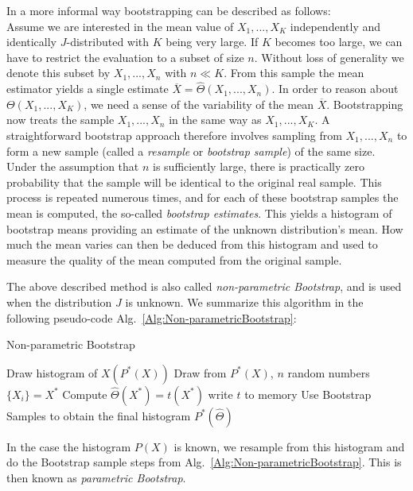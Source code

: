 \documentclass[11pt,a4paper]{article}
\numberwithin{equation}{section}
\begin{document}
%
In a more informal way bootstrapping can be described as follows:\\
Assume we are interested in the mean value of $X_1,...,X_K$ independently and identically $J$-distributed with $K$ being very large. 
%
If $K$ becomes too large, we can have to restrict the evaluation to a subset of size $n$.
%
Without loss of generality we denote this subset by $X_1,...,X_n$ with $n\ll K$.
%
From this sample the mean estimator yields a single estimate $\overline{X}=\hat \Theta(X_1,...,X_n)$. 
%
In order to reason about $ \Theta(X_1,...,X_K)$, we need a sense of the variability of the mean $\overline{X}$. 
%
Bootstrapping now treats the sample $X_1,...,X_n$ in the same way as $X_1,...,X_K$.
%
A straightforward bootstrap approach therefore involves sampling from $X_1,...,X_n$ to form a new sample (called a {\it resample} or {\it bootstrap sample}) of the same size.
%
Under the assumption that $n$ is sufficiently large, there is practically zero probability that the sample will be identical to the original real sample.
%
This process is repeated numerous times, and for each of these bootstrap samples the mean is computed, the so-called {\it bootstrap estimates}. 
%
This yields a histogram of bootstrap means providing an estimate of the unknown distribution's mean.
%
How much the mean varies can then be deduced from this histogram and used to measure the quality of the mean computed from the original sample. 

%
The above described method is also called {\it non-parametric Bootstrap}, and is used when the distribution $J$ is unknown.
%
We summarize this algorithm in the following pseudo-code Alg.~\eqref{Alg:Non-parametricBootstrap}:
\begin{algorithm}
	\caption{Non-parametric Bootstrap}
	\label{Alg:Non-parametricBootstrap}
	\begin{algorithmic}[1]
		\State Draw histogram of $X(P^*(X))$
		\State Draw from $P^*(X)$, $n$ random numbers $\{X_i\}=X^*$
		\State Compute $\hat \Theta (X^*)=t(X^*)$
		\State write $t$ to memory 
		\EndProcedure
		\State Use Bootstrap Samples to obtain the final histogram $P^*(\hat \Theta)$
		\EndProcedure
	\end{algorithmic}
\end{algorithm}
%
In the case the histogram $P(X)$ is known, we resample from this histogram and do the Bootstrap sample steps from Alg.~\eqref{Alg:Non-parametricBootstrap}. 
%
This is then known as {\it parametric Bootstrap}.
\end{document}
